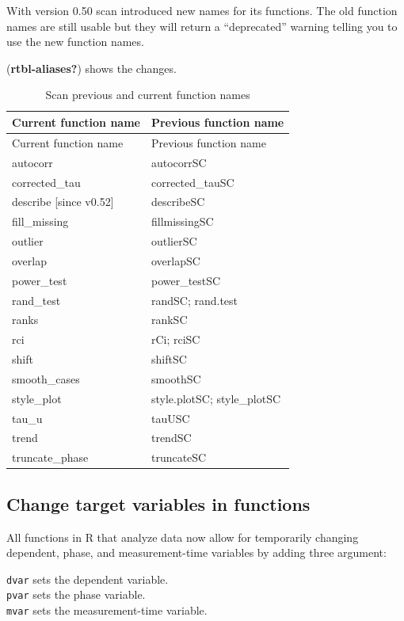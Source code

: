 \documentclass[
  letterpaper,
  DIV=11,
  numbers=noendperiod]{scrreprt}
\begin{document}
With version 0.50 scan introduced new names for its functions. The old
function names are still usable but they will return a ``deprecated''
warning telling you to use the new function names.

(\textbf{rtbl-aliases?}) shows the changes.

\hypertarget{tbl-aliases}{}
\begin{longtable}[]{@{}ll@{}}
\caption{\label{tbl-aliases}Scan previous and current function
names}\tabularnewline
\toprule()
Current function name & Previous function name \\
\midrule()
\endfirsthead
\toprule()
Current function name & Previous function name \\
\midrule()
\endhead
autocorr & autocorrSC \\
corrected\_tau & corrected\_tauSC \\
describe {[}since v0.52{]} & describeSC \\
fill\_missing & fillmissingSC \\
outlier & outlierSC \\
overlap & overlapSC \\
power\_test & power\_testSC \\
rand\_test & randSC; rand.test \\
ranks & rankSC \\
rci & rCi; rciSC \\
shift & shiftSC \\
smooth\_cases & smoothSC \\
style\_plot & style.plotSC; style\_plotSC \\
tau\_u & tauUSC \\
trend & trendSC \\
truncate\_phase & truncateSC \\
\bottomrule()
\end{longtable}

\hypertarget{change-target-variables-in-functions}{%
\subsection{Change target variables in
functions}\label{change-target-variables-in-functions}}

All functions in R that analyze data now allow for temporarily changing
dependent, phase, and measurement-time variables by adding three
argument:

\texttt{dvar} sets the dependent variable.\\
\texttt{pvar} sets the phase variable.\\
\texttt{mvar} sets the measurement-time variable.
\end{document}
